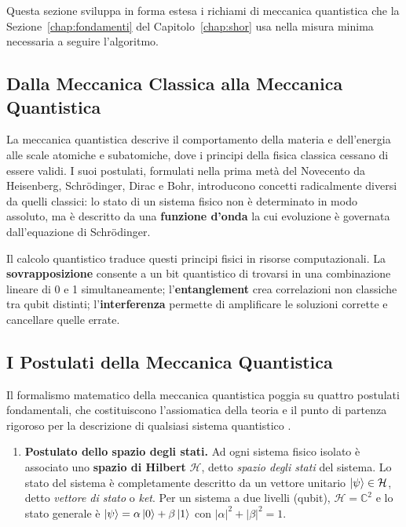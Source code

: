 \begin{onehalfspace}

Questa sezione sviluppa in forma estesa i richiami di meccanica quantistica che la
Sezione~\ref{chap:fondamenti} del Capitolo~\ref{chap:shor} usa nella misura
minima necessaria a seguire l'algoritmo.

\subsection{Dalla Meccanica Classica alla Meccanica Quantistica}

La meccanica quantistica descrive il comportamento della materia e dell'energia alle scale atomiche e subatomiche, dove i principi della fisica classica cessano di essere validi. I suoi postulati, formulati nella prima metà del Novecento da Heisenberg, Schrödinger, Dirac e Bohr, introducono concetti radicalmente diversi da quelli classici: lo stato di un sistema fisico non è determinato in modo assoluto, ma è descritto da una \textbf{funzione d'onda} la cui evoluzione è governata dall'equazione di Schrödinger.

Il calcolo quantistico traduce questi principi fisici in risorse computazionali. La \textbf{sovrapposizione} consente a un bit quantistico di trovarsi in una combinazione lineare di 0 e 1 simultaneamente; l'\textbf{entanglement} crea correlazioni non classiche tra qubit distinti; l'\textbf{interferenza} permette di amplificare le soluzioni corrette e cancellare quelle errate.

\clearpage
\subsection{I Postulati della Meccanica Quantistica}

Il formalismo matematico della meccanica quantistica poggia su quattro postulati fondamentali, che costituiscono l'assiomatica della teoria e il punto di partenza rigoroso per la descrizione di qualsiasi sistema quantistico \cite{nielsenChuang2000}.

\begin{enumerate}
    \item \textbf{Postulato dello spazio degli stati.} Ad ogni sistema fisico isolato è associato uno \textbf{spazio di Hilbert} $\mathcal{H}$, detto \textit{spazio degli stati} del sistema. Lo stato del sistema è completamente descritto da un vettore unitario $\ket{\psi} \in \mathcal{H}$, detto \textit{vettore di stato} o \textit{ket}. Per un sistema a due livelli (qubit), $\mathcal{H} = \mathbb{C}^2$ e lo stato generale è $\ket{\psi} = \alpha\ket{0} + \beta\ket{1}$ con $|\alpha|^2 + |\beta|^2 = 1$.


\end{enumerate}
\end{onehalfspace}
